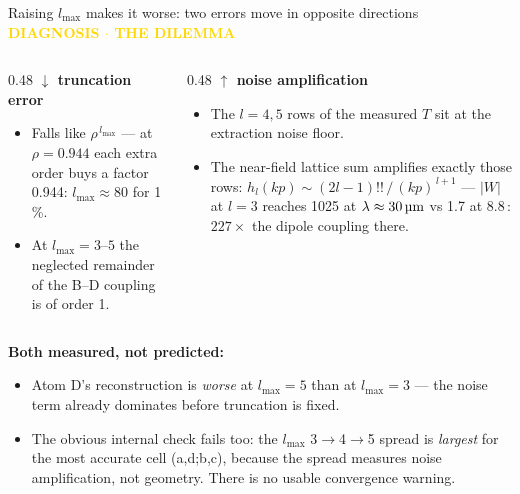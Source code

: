 \documentclass[10pt,aspectratio=169]{beamer}
\newcommand{\kicker}[1]{{\footnotesize\bfseries\textcolor{gold}{#1}}\\[-0.4ex]}
\newcommand{\um}{\,\text{\textmu m}}
\begin{document}
\begin{frame}{Raising $l_{\max}$ makes it worse: two errors move in opposite directions}
  \kicker{DIAGNOSIS  $\cdot$  THE DILEMMA}
  \begin{columns}[t]
    \begin{column}{0.48\textwidth}
      {\textcolor{good}{\textbf{$\downarrow$ truncation error}}}
      \begin{itemize}\small
        \item Falls like $\rho^{\,l_{\max}}$ --- at $\rho = 0.944$ each extra order buys a factor 0.944: $l_{\max}\approx 80$ for 1\,\%.
        \item At $l_{\max} = 3$--$5$ the neglected remainder of the B--D coupling is of order 1.
      \end{itemize}
    \end{column}
    \begin{column}{0.48\textwidth}
      {\textcolor{bad}{\textbf{$\uparrow$ noise amplification}}}
      \begin{itemize}\small
        \item The $l = 4,5$ rows of the measured $T$ sit at the extraction noise floor.
        \item The near-field lattice sum amplifies exactly those rows:
              $h_l(kp) \sim (2l-1)!!\,/\,(kp)^{\,l+1}$ --- $|W|$ at $l=3$ reaches 1025 at $\lambda \approx 30\um$
              vs 1.7 at 8.8\um: $227\times$ the dipole coupling there.
      \end{itemize}
    \end{column}
  \end{columns}
  \vspace{2ex}
  \colorbox{cardgold}{\parbox{0.96\textwidth}{\small\textbf{\textcolor{golddk}{Both measured, not predicted:}}
  \begin{itemize}\small
    \item Atom D's reconstruction is \emph{worse} at $l_{\max}=5$ than at $l_{\max}=3$ --- the noise term already dominates before truncation is fixed.
    \item The obvious internal check fails too: the $l_{\max}$ 3$\to$4$\to$5 spread is \emph{largest} for the most accurate cell (a,d;b,c), because the spread measures noise amplification, not geometry. There is no usable convergence warning.
  \end{itemize}}}
\end{frame}
\end{document}
